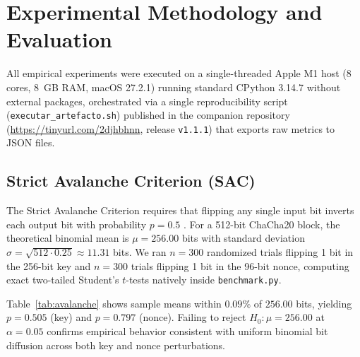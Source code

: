 \documentclass[conference]{IEEEtran}
\begin{document}
\section{Experimental Methodology and Evaluation}
\label{sec:eval}

All empirical experiments were executed on a single-threaded Apple M1 host (8 cores, 8~GB RAM, macOS 27.2.1) running standard CPython 3.14.7 without external packages, orchestrated via a single reproducibility script (\texttt{executar\_artefacto.sh}) published in the companion repository (\url{https://tinyurl.com/2djhbhnn}, release \texttt{v1.1.1}) that exports raw metrics to JSON files.

\subsection{Strict Avalanche Criterion (SAC)}
The Strict Avalanche Criterion requires that flipping any single input bit inverts each output bit with probability $p = 0.5$ \cite{vaughn2026relaxation, madarrocap2021measuring}. For a 512-bit ChaCha20 block, the theoretical binomial mean is $\mu = 256.00$ bits with standard deviation $\sigma = \sqrt{512 \cdot 0.25} \approx 11.31$ bits. We ran $n = 300$ randomized trials flipping 1 bit in the 256-bit key and $n = 300$ trials flipping 1 bit in the 96-bit nonce, computing exact two-tailed Student's $t$-tests natively inside \texttt{benchmark.py}.

\begin{table}[htbp]
\caption{Strict Avalanche Criterion Dynamics ($n = 300$ Trials, $df = 299$)}
\label{tab:avalanche}
\centering
{}
\end{table}

Table~\ref{tab:avalanche} shows sample means within $0.09\%$ of $256.00$ bits, yielding $p = 0.505$ (key) and $p = 0.797$ (nonce). Failing to reject $H_0: \mu = 256.00$ at $\alpha = 0.05$ confirms empirical behavior consistent with uniform binomial bit diffusion across both key and nonce perturbations.
\end{document}
